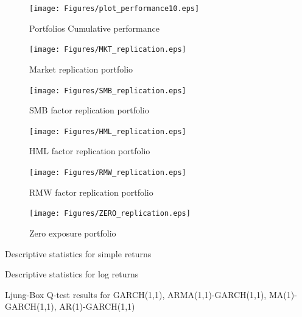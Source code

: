 \documentclass[a4paper]{article}
\begin{document}
\begin{figure}[htbp]
	\centering
	\texttt{[image: Figures/plot\_performance10.eps]}
	\caption{Portfolios Cumulative performance}
\end{figure}

\begin{figure}[htbp]
	\centering
	\texttt{[image: Figures/MKT\_replication.eps]}
	\caption{Market replication portfolio}
\end{figure}

\begin{figure}[htbp]
	\centering
	\texttt{[image: Figures/SMB\_replication.eps]}
	\caption{SMB factor replication portfolio}
\end{figure}

\begin{figure}[htbp]
	\centering
	\texttt{[image: Figures/HML\_replication.eps]}
	\caption{HML factor replication portfolio}
\end{figure}

\begin{figure}[htbp]
	\centering
	\texttt{[image: Figures/RMW\_replication.eps]}
	\caption{RMW factor replication portfolio}
\end{figure}

\begin{figure}[htbp]
	\centering
	\texttt{[image: Figures/ZERO\_replication.eps]}
	\caption{Zero exposure portfolio}
\end{figure}








\clearpage

\begin {table}[htbp]
\begin{center}

\end{center}
\caption {Descriptive statistics for simple returns} \label{industry_summary} 
\end {table}

\begin {table}[htbp]
\begin{center}
	
\end{center}
\caption {Descriptive statistics for log returns} \label{industry_log_summary} 
\end {table}

\begin {table}[htbp]
\begin{center}
	
\end{center}
\caption {Ljung-Box Q-test results for GARCH(1,1), ARMA(1,1)-GARCH(1,1), MA(1)-GARCH(1,1), AR(1)-GARCH(1,1)}
\label{garch_summary} 
\end {table}
\end{document}
